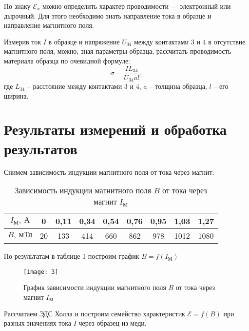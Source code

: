 По знаку $\mathscr{E}_x$ можно определить характер
проводимости — электронный или дырочный.
Для этого необходимо знать направление
тока в образце и направление магнитного
поля.

Измерив ток $I$ в образце и напряжение
$U_{34}$ 
между контактами 3 и 4 в отсутствие
магнитного поля, можно, зная параметры
образца, рассчитать проводимость
материала образца по очевидной формуле:
\begin{equation}
    \sigma = \frac{I L_{34}}{U_{34} a
    l},
\end{equation}
где $L_{34}$ -- расстояние между
контактами 3 и 4, $a$ -- толщина
образца, $l$ -- его ширина.

\section{Результаты измерений и обработка результатов}

Снимем зависимость индукции магнитного
поля от тока через магнит:
\renewcommand{\arraystretch}{1.1} 
\begin{table}[H]
\centering
\begin{tabular}{|c|c|c|c|c|c|c|c|c|}
\hline
$I_\text{М}, \ \text{А}$   & 0  & 0,11 & 0,34 & 0,54 & 0,76
       & 0,95 & 1,03 & 1,27 \\ \hline
$B, \ \text{мТл} $ & 20 & 133  & 414  & 660  & 862
       & 978  & 1012 & 1080 \\ \hline
\end{tabular}
\caption{Зависимость индукции магнитного
поля $B$ от тока через магнит
$I_\text{М}$}
\end{table}

По результатам в таблице 1 построим
график $B=f(I_\text{М})$


\begin{figure}[H]
    \texttt{[image: 3]} 
    \captionsetup{justification=centering}
    \caption{График зависимости индукции магнитного
поля $B$ от тока через магнит
$I_\text{М}$}
\end{figure}
Рассчитаем ЭДС Холла и построим
семейство характеристик $\mathscr{E} =
f(B)$ при разных значениях тока  $I$
через образец из меди.

